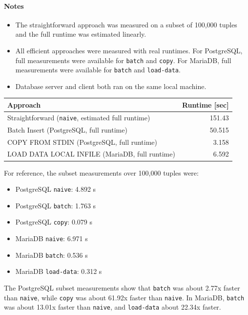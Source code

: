 \documentclass[11pt]{scrartcl}
\begin{document}
\paragraph{Notes}

\begin{itemize}
  \item The straightforward approach was measured on a subset of 100,000 tuples and the full runtime was estimated linearly.
  \item All efficient approaches were measured with real runtimes. For PostgreSQL, full measurements were available for \texttt{batch} and \texttt{copy}. For MariaDB, full measurements were available for \texttt{batch} and \texttt{load-data}.
  \item Database server and client both ran on the same local machine.
\end{itemize}

\begin{table}[H]
  \centering
  \begin{tabular}{l|r}
    Approach & Runtime [sec] \tabularnewline
    \hline
    Straightforward (\texttt{naive}, estimated full runtime) & 151.43 \tabularnewline
    Batch Insert (PostgreSQL, full runtime) & 50.515 \tabularnewline
    COPY FROM STDIN (PostgreSQL, full runtime) & 3.158 \tabularnewline
    LOAD DATA LOCAL INFILE (MariaDB, full runtime) & 6.592 \tabularnewline
  \end{tabular}
\end{table}

For reference, the subset measurements over 100,000 tuples were:

\begin{itemize}
  \item PostgreSQL \texttt{naive}: 4.892 s
  \item PostgreSQL \texttt{batch}: 1.763 s
  \item PostgreSQL \texttt{copy}: 0.079 s
  \item MariaDB \texttt{naive}: 6.971 s
  \item MariaDB \texttt{batch}: 0.536 s
  \item MariaDB \texttt{load-data}: 0.312 s
\end{itemize}

The PostgreSQL subset measurements show that \texttt{batch} was about 2.77x faster than \texttt{naive}, while \texttt{copy} was about 61.92x faster than \texttt{naive}. In MariaDB, \texttt{batch} was about 13.01x faster than \texttt{naive}, and \texttt{load-data} about 22.34x faster.
\end{document}
